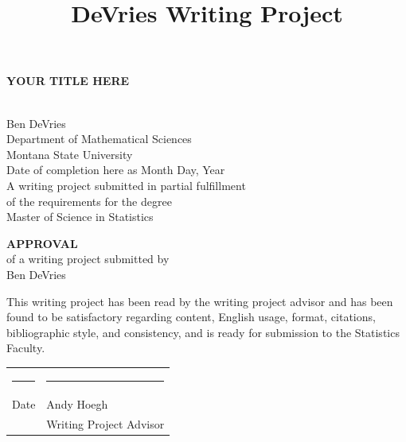 \documentclass[
  12pt,
  letterpaper,
  DIV=11,
  numbers=noendperiod]{scrartcl}
\title{DeVries Writing Project}
\author{}
\date{}
\newcommand{\myname}{Ben DeVries}
\newcommand{\myadvisor}{Andy Hoegh}
\newcommand{\maintitle}{YOUR TITLE HERE}
\newcommand{\mydate}{Date of completion here as Month Day, Year}
\begin{document}
\maketitle

\begin{singlespace}

\begin{titlepage}
\null
\vspace{2.in}
\begin{center}
{\LARGE\bfseries \maintitle} \vspace{.1in}

\vspace{.05in}
{\LARGE\bfseries $\;$} \\ [.5in]
{\Large  \myname \\
\vspace{0.5cm}
Department of Mathematical Sciences \\
Montana State University \\ [.5in]}
\mydate \\ [1.in]
A writing project submitted in partial fulfillment\\
of the requirements for the degree\\[.25in]
Master of Science in Statistics
\end{center}
\end{titlepage}

\begin{titlepage}
\null
\vspace{2.in}
\begin{center}
{\bfseries\huge APPROVAL}\\[1.in]
of a writing project submitted by\\[.25in]
\myname \\[1.in]
\end{center}
\noindent
This writing project has been read by the writing project advisor and
has been found to be satisfactory regarding content, English usage,
format, citations, bibliographic style, and consistency, and is ready
for submission to the Statistics Faculty.

\vspace{.3in}
\begin{center}
\begin{tabular}{ll}
\rule{2.75in}{.03in} & \rule{2.75in}{.03in} \\
Date& \myadvisor \\
& Writing Project Advisor \\
\end{tabular}
\end{center}


\end{titlepage}
\end{singlespace}
\end{document}
